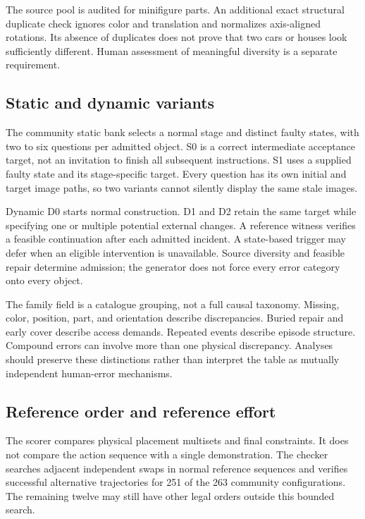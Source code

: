 \documentclass[10pt,twocolumn,letterpaper]{article}
\begin{document}
The source pool is audited for minifigure parts. An additional exact structural duplicate check ignores color and translation and normalizes axis-aligned rotations. Its absence of duplicates does not prove that two cars or houses look sufficiently different. Human assessment of meaningful diversity is a separate requirement.

\subsection{Static and dynamic variants}
The community static bank selects a normal stage and distinct faulty states, with two to six questions per admitted object. S0 is a correct intermediate acceptance target, not an invitation to finish all subsequent instructions. S1 uses a supplied faulty state and its stage-specific target. Every question has its own initial and target image paths, so two variants cannot silently display the same stale images.

Dynamic D0 starts normal construction. D1 and D2 retain the same target while specifying one or multiple potential external changes. A reference witness verifies a feasible continuation after each admitted incident. A state-based trigger may defer when an eligible intervention is unavailable. Source diversity and feasible repair determine admission; the generator does not force every error category onto every object.

The family field is a catalogue grouping, not a full causal taxonomy. Missing, color, position, part, and orientation describe discrepancies. Buried repair and early cover describe access demands. Repeated events describe episode structure. Compound errors can involve more than one physical discrepancy. Analyses should preserve these distinctions rather than interpret the table as mutually independent human-error mechanisms.

\subsection{Reference order and reference effort}
The scorer compares physical placement multisets and final constraints. It does not compare the action sequence with a single demonstration. The checker searches adjacent independent swaps in normal reference sequences and verifies successful alternative trajectories for 251 of the 263 community configurations. The remaining twelve may still have other legal orders outside this bounded search.
\end{document}
